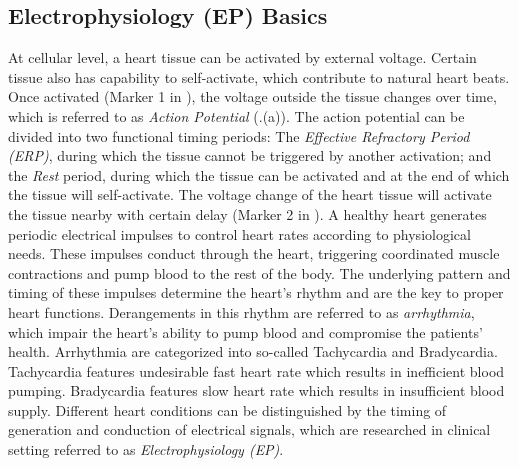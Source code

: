 \subsection{Electrophysiology (EP) Basics}
At cellular level, a heart tissue can be activated by external voltage. Certain tissue also has capability to self-activate, which contribute to natural heart beats. Once activated (Marker 1 in ), the voltage outside the tissue changes over time, which is referred to as \emph{Action Potential} (.(a)). The action potential can be divided into two functional timing periods: The \emph{Effective Refractory Period (ERP)}, during which the tissue cannot be triggered by another activation; and the \emph{Rest} period, during which the tissue can be activated and at the end of which the tissue will self-activate. The voltage change of the heart tissue will activate the tissue nearby with certain delay (Marker 2 in ).  A healthy heart generates periodic electrical impulses to control heart rates according to physiological needs. These impulses conduct through the heart, triggering coordinated muscle contractions and pump blood to the rest of the body. The underlying pattern and timing of these impulses determine the heart's rhythm and are the key to proper heart functions. Derangements in this rhythm are referred to as \emph{arrhythmia}, which impair the heart's ability to pump blood and compromise the patients' health. Arrhythmia are categorized into so-called \textsf{Tachycardia} and \textsf{Bradycardia}. Tachycardia features undesirable fast heart rate which results in inefficient blood pumping. Bradycardia features slow heart rate which results in insufficient blood supply.
Different heart conditions can be distinguished by the timing of generation and conduction of electrical signals, which are researched in clinical setting referred to as \emph{Electrophysiology (EP)}\cite{josephson}.

